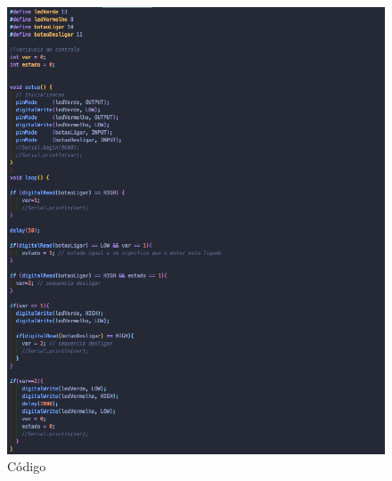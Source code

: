 \begin{anexosenv}
\begin{figure}[!ht]
	\centering
		\includegraphics[scale=0.6]{figuras/energia/codigo.png}
	\caption{Código}
\end{figure}

\end{anexosenv}

